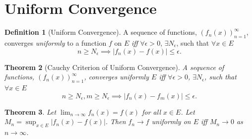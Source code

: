 \documentclass[a4paper,12pt]{report}
\theoremstyle{plain}
\newtheorem{theorem}{\color{blue}Theorem}[chapter] %
\theoremstyle{definition}
\newtheorem{definition}[theorem]{\color{red}Definition} %
\theoremstyle{remark}
\begin{document}
\section{Uniform Convergence}
\begin{definition}[Uniform Convergence]
A sequence of functions, $(f_n(x))_{n=1}^\infty$, converges \emph{uniformly} to a function $f$ on $E$ \emph{iff} $\forall\epsilon>0$, $\exists N_\epsilon$, such that $\forall x\in E$ 
\[n\ge N_\epsilon\implies |f_n(x)-f(x)|\le\epsilon.\]
\end{definition}

\begin{theorem}[Cauchy Criterion of Uniform Convergence]
A sequence of functions, $(f_n(x))_{n=1}^\infty$, converges \emph{uniformly} $E$ \emph{iff} $\forall\epsilon>0$, $\exists N_\epsilon$, such that $\forall x\in E$
\[n\ge N_\epsilon,m\ge N_\epsilon\implies |f_n(x)-f_m(x)|\le\epsilon.\]
\end{theorem}

\begin{theorem}
Let $\lim_{n\to\infty}f_n(x)=f(x)$ for all $x\in E$. Let $M_n=\sup_{x\in E}|f_n(x)-f(x)|$. Then $f_n\to f$ uniformly on $E$ \emph{iff} $M_n\to 0$ as $n\to\infty$.
\end{theorem}
\end{document}
